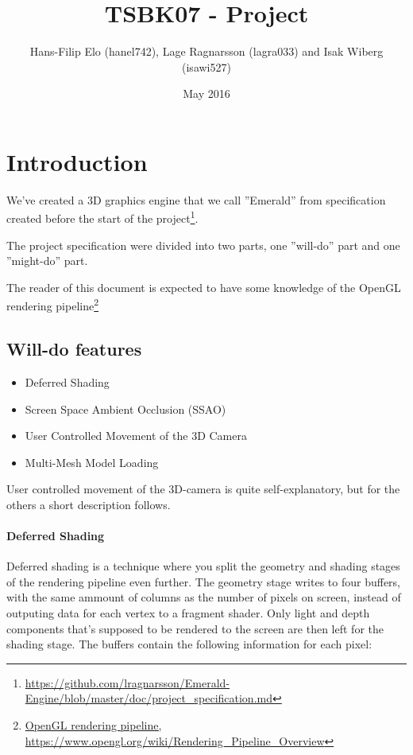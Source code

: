 \documentclass{article}
\title{TSBK07 - Project}
\author{Hans-Filip Elo (hanel742), Lage Ragnarsson (lagra033) and Isak Wiberg (isawi527)}
\date{May 2016}
\begin{document}
\maketitle
\newpage
\section{Introduction}

We've created a 3D graphics engine that we call ''Emerald'' from specification created before the start of the project\footnote{\url{https://github.com/lragnarsson/Emerald-Engine/blob/master/doc/project_specification.md}}.

The project specification were divided into two parts, one ''will-do'' part and one ''might-do'' part.

The reader of this document is expected to have some knowledge of the OpenGL rendering pipeline\footnote{\url{OpenGL rendering pipeline, https://www.opengl.org/wiki/Rendering_Pipeline_Overview}}

\subsection{Will-do features}

\begin{itemize}
    \item Deferred Shading
    \item Screen Space Ambient Occlusion (SSAO)
    \item User Controlled Movement of the 3D Camera
    \item Multi-Mesh Model Loading
\end{itemize}

User controlled movement of the 3D-camera is quite self-explanatory, but for the others a short description follows.

\paragraph{Deferred Shading}
Deferred shading is a technique where you split the geometry and shading stages of the rendering pipeline even further. The geometry stage writes to four buffers, with the same ammount of columns as the number of pixels on screen, instead of outputing data for each vertex to a fragment shader. Only light and depth components that's supposed to be rendered to the screen are then left for the shading stage. The buffers contain the following information for each pixel:
\end{document}
